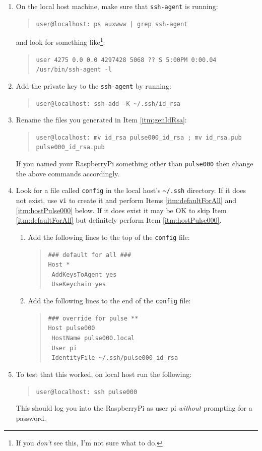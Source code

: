 \documentclass[11pt,oneside]{article}
\makeatletter
\newcommand{\localCommand}[1]{\begin{quote} \texttt{user@localhost: #1} \end{quote}}
\newcommand{\xtermPartialOutput}[1]{\begin{verse} \texttt{#1} \end{verse}}
\makeatother
\begin{document}
\begin{enumerate}
	\item On the local host machine, make sure that \texttt{ssh-agent} is running: \localCommand{ps auxwww | grep ssh-agent}
	and look for something like\footnote{If you {\em don't} see this, I'm not sure what to do.}: \xtermPartialOutput{user               4275   0.0  0.0  4297428   5068   ??  S     5:00PM   0:00.04 /usr/bin/ssh-agent -l}
	\item Add the private key to the \texttt{ssh-agent} by running: \localCommand{ssh-add -K {\textasciitilde}/.ssh/id\_rsa}
	\item Rename the files you generated in Item \ref{itm:genIdRsa}: \localCommand{mv id\_rsa pulse000\_id\_rsa ; mv id\_rsa.pub pulse000\_id\_rsa.pub}
	If you named your RaspberryPi something other than \texttt{pulse000} then change the above commands accordingly.
	\item Look for a file called \texttt{config} in the local host's \texttt{{\textasciitilde}/.ssh} directory.  If it does not exist, use \texttt{vi} to create it and perform Items \ref{itm:defaultForAll} and \ref{itm:hostPulse000}
	below.  If it does exist it may be OK to skip Item \ref{itm:defaultForAll} but definitely perform Item \ref{itm:hostPulse000}.
	\begin{enumerate}
		\item \label{itm:defaultForAll} Add the following lines to the top of the \texttt{config} file: \xtermPartialOutput{\#\#\# default for all \#\#\# \\Host *\\ \ AddKeysToAgent yes \\ \ UseKeychain yes}
		\item \label{itm:hostPulse000} Add the following lines to the end of the \texttt{config} file:
		\xtermPartialOutput{\#\#\# override for pulse **\\ Host pulse000\\ \ HostName pulse000.local\\ \ User pi\\ \ IdentityFile {\textasciitilde}/.ssh/pulse000\_id\_rsa}
	\end{enumerate}
	\item To test that this worked, on local host run the following: \localCommand{ssh pulse000}
	This should log you into the RaspberryPi as user pi {\em without} prompting for a password.
\end{enumerate}
\end{document}

